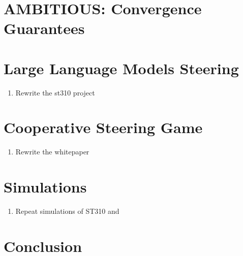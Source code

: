 \documentclass[a4paper,oneside,11pt]{report}
\begin{document}






\chapter{AMBITIOUS: Convergence Guarantees}

\chapter{Large Language Models Steering}
\begin{enumerate}
    \item Rewrite the st310 project
\end{enumerate}
\chapter{Cooperative Steering Game}
\begin{enumerate}
    \item Rewrite the whitepaper
\end{enumerate}
\chapter{Simulations}
\begin{enumerate}
    \item Repeat simulations of ST310 and \cite{kim2021policygradientalgorithmlearning}
\end{enumerate}

\chapter{Conclusion}




\end{document}
